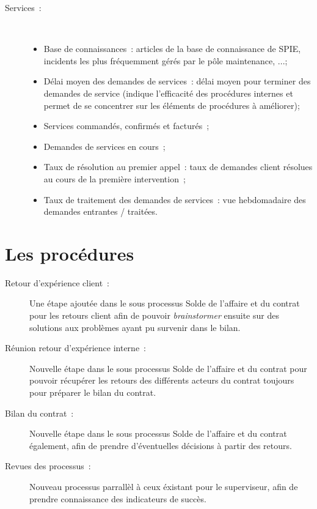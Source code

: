 \begin{description}
        \item[Services~:] ~ \\
            \begin{itemize}
                \item Base de connaissances~: articles de la base de connaissance de SPIE, incidents les plus fréquemment gérés par le pôle maintenance, ...;
                \item Délai moyen des demandes de services~: délai moyen pour terminer des demandes de service (indique l'efficacité des procédures internes et permet de se concentrer sur les éléments de procédures à améliorer);
                \item Services commandés, confirmés et facturés~;
                \item Demandes de services en cours~;
                \item Taux de résolution au premier appel~: taux de demandes client résolues au cours de la première intervention~;
                \item Taux de traitement des demandes de services~: vue hebdomadaire des demandes entrantes / traitées.
            \end{itemize}

    \end{description}

\section{Les procédures}

\begin{description}
    \item[Retour d'expérience client~:] Une étape ajoutée dans le sous processus Solde de l'affaire et du contrat pour les retours client afin de pouvoir \textit{brainstormer} ensuite sur des solutions aux problèmes ayant
    pu survenir dans le bilan.
    \item[R\'eunion retour d'expérience interne~:] Nouvelle étape dans le sous processus Solde de l'affaire et du contrat pour pouvoir r\'ecup\'erer les retours des différents acteurs du contrat toujours pour préparer
    le bilan du contrat.
    \item[Bilan du contrat~:] Nouvelle étape dans le sous processus Solde de l'affaire et du contrat également, afin de prendre d'éventuelles d\'ecisions \`a partir des retours.
    \item[Revues des processus~:] Nouveau processus parrall\`el \`a ceux \'existant pour le superviseur, afin de prendre connaissance des indicateurs de succès.
\end{description}


